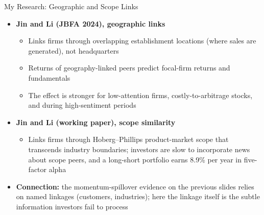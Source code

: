 \documentclass[aspectratio=169, 11pt]{beamer}
\begin{document}
\begin{frame}[shrink=5]{My Research: Geographic and Scope Links}
\begin{itemize}
\item \textbf{Jin and Li (JBFA 2024), geographic links}
  \begin{itemize}
  \item Links firms through overlapping establishment locations (where sales are generated), not headquarters
  \item Returns of geography-linked peers predict focal-firm returns and fundamentals
  \item The effect is stronger for low-attention firms, costly-to-arbitrage stocks, and during high-sentiment periods
  \end{itemize}
\item \textbf{Jin and Li (working paper), scope similarity}
  \begin{itemize}
  \item Links firms through Hoberg--Phillips product-market scope that transcends industry boundaries; investors are slow to incorporate news about scope peers, and a long-short portfolio earns 8.9\% per year in five-factor alpha
  \end{itemize}
\item \textbf{Connection:} the momentum-spillover evidence on the previous slides relies on named linkages (customers, industries); here the linkage itself is the subtle information investors fail to process
\end{itemize}
\end{frame}
\end{document}
